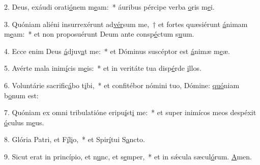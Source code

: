 2. Deus, exáudi orati\uline{ó}nem m\uline{e}am:~* áuribus pércipe verba \uline{o}ris m\uline{e}i.\par 
3. Quóniam aliéni insurrexérunt ad\uline{vér}sum me,~† et fortes quæsiérunt \uline{á}nimam m\uline{e}am:~* et non proposuérunt Deum ante consp\uline{é}ctum s\uline{u}um.\par 
4. Ecce enim Deus \uline{á}djuv\uline{a}t me:~* et Dóminus suscéptor est \uline{á}nimæ m\uline{e}æ.\par 
5. Avérte mala inim\uline{í}cis m\uline{e}is:~* et in veritáte tua disp\uline{é}rde \uline{i}llos.\par 
6. Voluntárie sacrific\uline{á}bo t\uline{i}bi,~* et confitébor nómini tuo, Dómine: \uline{quó}niam b\uline{o}num est:\par 
7. Quóniam ex omni tribulatióne eripu\uline{í}st\uline{i} me:~* et super inimícos meos despéxit \uline{ó}culus m\uline{e}us.\par 
8. Glória Patri, et F\uline{í}l\uline{i}o,~* et Spir\uline{í}tui S\uline{a}ncto.\par 
9. Sicut erat in princípio, et n\uline{u}nc, et s\uline{e}mper,~* et in sǽcula sæcul\uline{ó}rum. \uline{A}men.\par 

